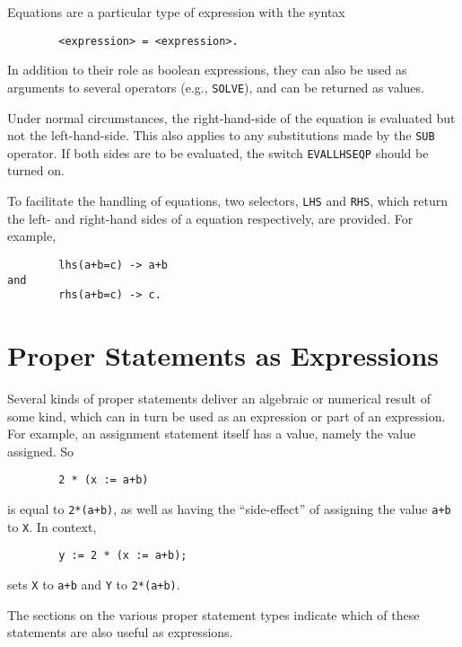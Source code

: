 Equations are a particular type of expression with the syntax

\begin{verbatim}
        <expression> = <expression>.
\end{verbatim}

In addition to their role as boolean expressions, they can also be used as
arguments to several operators (e.g., {\tt SOLVE}), and can be
returned as values.

Under normal circumstances, the right-hand-side of the equation is
evaluated but not the left-hand-side.  This also applies to any substitutions
made by the {\tt SUB} operator.  If both sides are to be
evaluated, the switch {\tt EVALLHSEQP} should be
turned on.

To facilitate the handling of equations, two selectors, {\tt LHS}
 and {\tt RHS}, which return the left- and
right-hand sides of a equation respectively, are provided.
For example,
\begin{verbatim}
        lhs(a+b=c) -> a+b
and
        rhs(a+b=c) -> c.
\end{verbatim}

\section{Proper Statements as Expressions}

Several kinds of proper statements deliver
an algebraic or numerical result of some kind, which can in turn be used as
an expression or part of an expression.  For example, an assignment
statement itself has a value, namely the value assigned.  So
\begin{verbatim}
        2 * (x := a+b)
\end{verbatim}
is equal to {\tt 2*(a+b)}, as well as having the ``side-effect'' of assigning the value {\tt a+b} to {\tt X}.  In context,
\begin{verbatim}
        y := 2 * (x := a+b);
\end{verbatim}
sets {\tt X} to {\tt a+b} and {\tt Y} to {\tt 2*(a+b)}.

The sections on the various proper statement types
indicate which of these statements are also useful as expressions.

